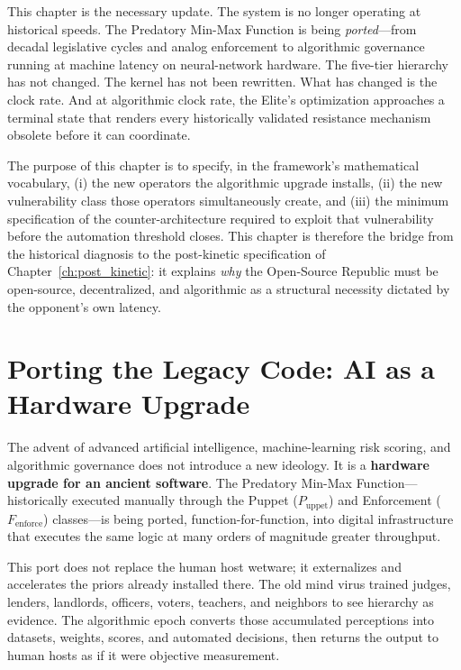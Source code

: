 This chapter is the necessary update. The system is no longer operating at historical speeds. The Predatory Min-Max Function is being \textit{ported}---from decadal legislative cycles and analog enforcement to algorithmic governance running at machine latency on neural-network hardware. The five-tier hierarchy has not changed. The kernel has not been rewritten. What has changed is the clock rate. And at algorithmic clock rate, the Elite's optimization approaches a terminal state that renders every historically validated resistance mechanism obsolete before it can coordinate.

The purpose of this chapter is to specify, in the framework's mathematical vocabulary, (i) the new operators the algorithmic upgrade installs, (ii) the new vulnerability class those operators simultaneously create, and (iii) the minimum specification of the counter-architecture required to exploit that vulnerability before the automation threshold closes. This chapter is therefore the bridge from the historical diagnosis to the post-kinetic specification of Chapter~\ref{ch:post_kinetic}: it explains \textit{why} the Open-Source Republic must be open-source, decentralized, and algorithmic as a structural necessity dictated by the opponent's own latency.

\section{Porting the Legacy Code: AI as a Hardware Upgrade}
\label{sec:porting_legacy}

The advent of advanced artificial intelligence, machine-learning risk scoring, and algorithmic governance does not introduce a new ideology. It is a \textbf{hardware upgrade for an ancient software}. The Predatory Min-Max Function---historically executed manually through the Puppet ($P_{\text{uppet}}$) and Enforcement ($F_{\text{enforce}}$) classes---is being ported, function-for-function, into digital infrastructure that executes the same logic at many orders of magnitude greater throughput.

This port does not replace the human host wetware; it externalizes and accelerates the priors already installed there. The old mind virus trained judges, lenders, landlords, officers, voters, teachers, and neighbors to see hierarchy as evidence. The algorithmic epoch converts those accumulated perceptions into datasets, weights, scores, and automated decisions, then returns the output to human hosts as if it were objective measurement.

